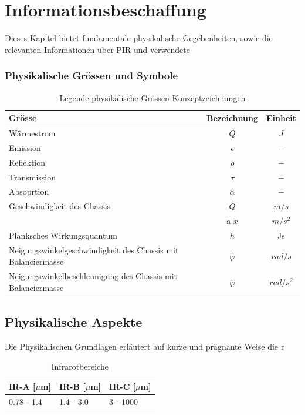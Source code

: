 \chapter{Informationsbeschaffung}
\label{chap:Informationsbeschaffung}
Dieses Kapitel bietet fundamentale physikalische Gegebenheiten, sowie die relevanten Informationen über \ac{PIR} und verwendete 


\subsection*{Physikalische Grössen und Symbole}


\begin{table}[H]
	\begin{tabular}{l|c|c}
		
		\rowcolor{gray} Grösse &  Bezeichnung  & Einheit \\
		\hline 
		Wärmestrom &  $\dot{Q}$ & $J$  \\ 
		\rowcolor{gray}Emission & $\epsilon$ & $-$\\	
		Reflektion &  $\rho $ & $-$ \\
		\rowcolor{gray} Transmission & $\tau$ & $-$\\
		Absoprtion &  $\alpha$ & $-$  \\ 
		
		\rowcolor{gray}Geschwindigkeit des Chassis & $\dot{Q}$ & $m/s$\\
		 &  a $\ddot{x}$ & $m/s^2$ \\
		\rowcolor{gray} Planksches Wirkungsquantum &  $ h$ & Js \\ 
		Neigungswinkelgeschwindigkeit des Chassis mit Balanciermasse & $\dot\varphi $ & $ rad/s$ \\ 
		\rowcolor{gray} Neigungswinkelbeschleunigung des Chassis mit Balanciermasse & $\ddot\varphi $ & $ rad/s^2 $ \\ 
	\end{tabular}
	\caption{Legende physikalische Grössen Konzeptzeichnungen}
	\label{tab:Legende Physikalische Grössen} 
\end{table} 



\section{Physikalische Aspekte}

Die Physikalischen Grundlagen erläutert auf kurze und prägnante Weise die r

\begin{table}[]
	\centering
	\label{my-label}
	\begin{tabular}{|l|l|l|}
		\hline
		\rowcolor{gray} IR-A {[}$\mu$m{]} & IR-B {[}$\mu$m{]} & IR-C {[}$\mu$m{]} \\ \hline
		0.78 - 1.4  & 1.4 - 3.0   & 3 - 1000    \\ \hline
	\end{tabular}
	\caption{Infrarotbereiche}
\end{table}

